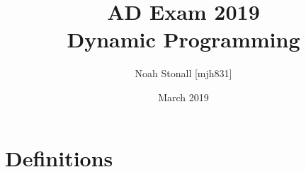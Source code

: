 \documentclass{article}
\title{AD Exam 2019 \\ Dynamic Programming}
\author{Noah Stonall [mjh831]}
\date{March 2019}
\begin{document}
\maketitle

\section*{Definitions}

\end{document}
